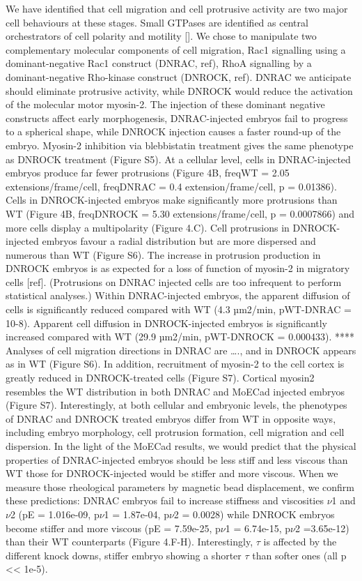 We have identified that cell migration and cell protrusive activity are two major cell behaviours at these stages.
Small GTPases are identified as central orchestrators of cell polarity and motility [].
We chose to manipulate two complementary molecular components of cell migration, Rac1 signalling using a dominant-negative Rac1 construct (DNRAC, ref), RhoA signalling by a dominant-negative Rho-kinase construct (DNROCK, ref).
DNRAC we anticipate should eliminate protrusive activity, while DNROCK would reduce the activation of the molecular motor myosin-2.
The injection of these dominant negative constructs affect early morphogenesis, DNRAC-injected embryos fail to progress to a spherical shape, while DNROCK injection causes a faster round-up of the embryo. Myosin-2 inhibition via blebbistatin treatment gives the same phenotype as DNROCK treatment (Figure S5).
At a cellular level, cells in DNRAC-injected embryos produce far fewer protrusions (Figure 4B, freqWT = 2.05 extensions/frame/cell, freqDNRAC = 0.4 extension/frame/cell, p = 0.01386). Cells in DNROCK-injected embryos make significantly more protrusions than WT (Figure 4B, freqDNROCK = 5.30 extensions/frame/cell, p = 0.0007866) and more cells display a multipolarity (Figure 4.C).
Cell protrusions in DNROCK-injected embryos favour a radial distribution but are more dispersed and numerous than WT (Figure S6). The increase in protrusion production in DNROCK embryos is as expected for a loss of function of myosin-2 in migratory cells [ref]. (Protrusions on DNRAC injected cells are too infrequent to perform statistical analyses.)
Within DNRAC-injected embryos, the apparent diffusion of cells is significantly reduced compared with WT (4.3 µm2/min, pWT-DNRAC = 10-8).
Apparent cell diffusion in DNROCK-injected embryos is significantly increased compared with WT (29.9 µm2/min, pWT-DNROCK = 0.000433). **** Analyses of cell migration directions in DNRAC are …., and in DNROCK appears as in WT (Figure S6).
In addition, recruitment of myosin-2 to the cell cortex is greatly reduced in DNROCK-treated cells (Figure S7). Cortical myosin2 resembles the WT distribution in both DNRAC and MoECad injected embryos (Figure S7).
Interestingly, at both cellular and embryonic levels, the phenotypes of DNRAC and DNROCK treated embryos differ from WT in opposite ways, including embryo morphology, cell protrusion formation, cell migration and cell dispersion.
In the light of the MoECad results, we would predict that the physical properties of DNRAC-injected embryos should be less stiff and less viscous than WT those for DNROCK-injected would be stiffer and more viscous.
When we measure those rheological parameters by magnetic bead displacement, we confirm these predictions: DNRAC embryos fail to increase stiffness and viscosities $\nu$1 and $\nu$2 (pE = 1.016e-09, p$\nu$1 = 1.87e-04, p$\nu$2 = 0.0028) while DNROCK embryos become stiffer and more viscous (pE = 7.59e-25, p$\nu$1 = 6.74e-15, p$\nu$2 =3.65e-12) than their WT counterparts (Figure 4.F-H). Interestingly, $\tau$ is affected by the different knock downs, stiffer embryo showing a shorter $\tau$ than softer ones (all p << 1e-5).

